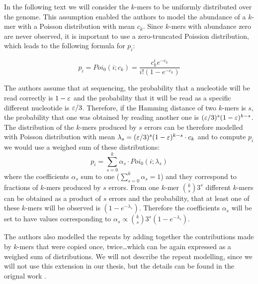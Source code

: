 In the following text we will consider the $k$-mers to be uniformly distributed
over the genome. This assumption enabled the authors to model the abundance of a $k$-mer
with a Poisson distribution with mean $c_k$. Since $k$-mers with abundance zero are never
observed, it is important to use a zero-truncated Poission distribution, 
which leads to the following formula for $p_i$:

$$ p_i = Poi_0(i; c_k) = \frac{c_k^i e^{-c_k}}{i!(1 - e^{-c_k})} $$

The authors assume that at sequencing, the probability that a nucleotide will be read
correctly is $1-\varepsilon$ and the probability that it will be read as a specific different
nucleotide is $\varepsilon/3$. Therefore, if the Hamming distance of two $k$-mers is $s$, the
probability that one was obtained by reading another one is $(\varepsilon/3)^s(1-\varepsilon)^{k-s}$.
The distribution of the $k$-mers produced by $s$ errors can be
therefore modelled with Poisson distribution with mean 
$\lambda_s = (\varepsilon/3)^s(1-\varepsilon)^{k-s} \cdot c_k$ and to compute $p_i$ we would use
a weighed sum of these distributions:
$$ p_i = \sum_{s=0}^k \alpha_s \cdot Poi_0(i; \lambda_s) $$
where the coefficients $\alpha_s$ sum to one ($\sum_{s=0}^k \alpha_s = 1$) and they correspond
to fractions of $k$-mers produced by $s$ errors. From one $k$-mer ${k \choose s} 3^s$ 
different $k$-mers can be obtained as a product of $s$ errors and the probability, 
that at least one of these $k$-mers will be observed is $(1 - e^{-\lambda_s})$. 
Therefore the coefficients $\alpha_s$ will be set to have values corresponding to 
$\alpha_s \propto {k \choose s} 3^s(1 - e^{-\lambda_s})$.

The authors also modelled the repeats by adding together the contributions made by
$k$-mers that were copied once, twice\dots which can be again expressed as a weighed sum of
distributions. We will not describe the repeat modelling, since we will not use this extension
in our thesis, but the details can be found in the orignal work \cite{Hozza2015, Hozza2016}.  


